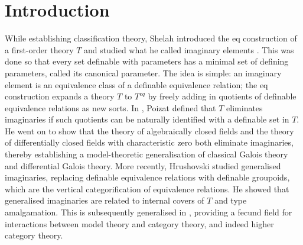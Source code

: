 \section{Introduction}

While establishing classification theory, Shelah introduced the eq construction of a first-order theory $T$ and studied what he called imaginary elements \cite[Ch.~III \S6]{shelahbook}. This was done so that every set definable with parameters has a minimal set of defining parameters, called its canonical parameter. The idea is simple: an imaginary element is an equivalence class of a definable equivalence relation; the eq construction expands a theory $T$ to $T^{eq}$ by freely adding in quotients of definable equivalence relations as new sorts. In \cite{poizat_imaginary_galois}, Poizat defined that $T$ eliminates imaginaries if such quotients can be naturally identified with a definable set in $T$. He went on to show that the theory of algebraically closed fields and the theory of differentially closed fields with characteristic zero both eliminate imaginaries, thereby establishing a model-theoretic generalisation of classical Galois theory and differential Galois theory. More recently, Hrushovski \cite{hrushovski_groupoid} studied generalised imaginaries, replacing definable equivalence relations with definable groupoids, which are the vertical categorification of equivalence relations. He showed that generalised imaginaries are related to internal covers of $T$ and type amalgamation. This is subsequently generalised in \cite{GoodrickJohn2013Afab,GoodrickJohn2014Tpap,GoodrickJohn2010Gca3,kamensky_cat_app_int,kamensky_higher_int_cov,moosa_haykazyan,wang_simp_grpd}, providing a fecund field for interactions between model theory and category theory, and indeed higher category theory.

\smallskip

